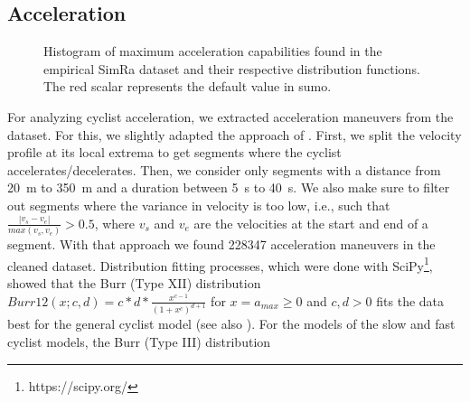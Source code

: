 \subsection{Acceleration}
\label{subsec:acceleration_preprocessing}
\begin{figure}
    \centering
    \hfill
    \caption{%
        Histogram of maximum acceleration capabilities found in the empirical SimRa dataset and their respective distribution functions.
        The red scalar represents the default value in \ac{sumo}.
    }%
    \label{fig:analysis_max_acceleration_dist_fit}
\end{figure}

For analyzing cyclist acceleration, we extracted acceleration maneuvers from the dataset.
For this, we slightly adapted the approach of \cite{ma2016modeling}.
First, we split the velocity profile at its local extrema to get segments where the cyclist accelerates/decelerates.
Then, we consider only segments with a distance from \SI{20}{\metre} to \SI{350}{\metre} and a duration between \SI{5}{\second} to \SI{40}{\second}.
We also make sure to filter out segments where the variance in velocity is too low, i.e., such that $ \frac{|v_{s} - v_{e}|}{max(v_{s},v_{e})} > 0.5 $, where $v_{s}$ and $v_{e}$ are the velocities at the start and end of a segment.
With that approach we found \num{228347} acceleration maneuvers in the cleaned dataset.
Distribution fitting processes, which were done with SciPy\footnote{https://scipy.org/}, showed that the Burr (Type XII) distribution~\cite{burr1942cumulative} $Burr12(x; c,d) = c*d*\frac{x^{c-1}}{(1+x^c)^{d+1}}$ for $x = a_{max} \geq 0$ and $c,d > 0$  fits the data best for the general cyclist model (see also ).
For the models of the slow and fast cyclist models, the Burr (Type III) distribution~\cite{burr1942cumulative}

